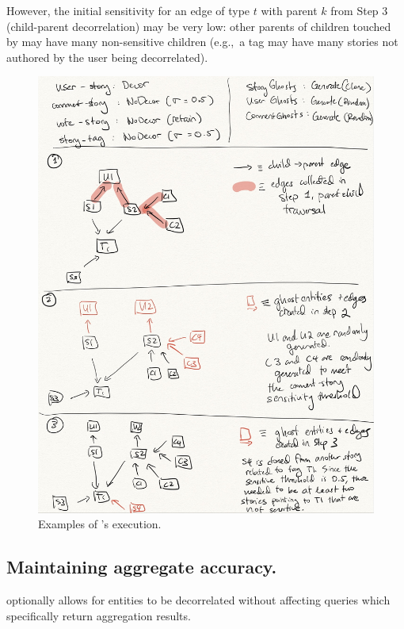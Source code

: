 However, the initial sensitivity for an edge of type $t$ with parent $k$ from Step 3 (child-parent
decorrelation) may be very low: other parents of children touched by \sys{} may have many
non-sensitive children (e.g.,\ a tag may have many stories not authored by the user being
decorrelated).

\begin{figure}[t!]
    \includegraphics[width=.5\textwidth]{img/algo}
    \caption{Examples of \sys{}'s execution.}
\end{figure}

%


\subsection{Maintaining aggregate accuracy.}
\sys{} optionally allows for entities to be decorrelated without affecting queries which
specifically return aggregation results.

